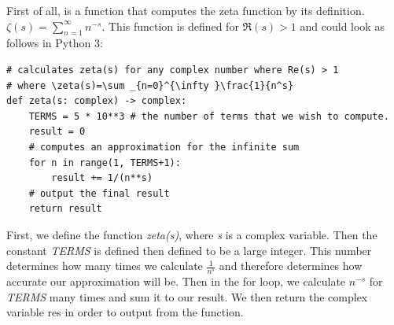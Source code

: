 \documentclass{article}
\begin{document}
First of all, is a function that computes the zeta function by its definition. $\zeta(s) = \sum_{n=1}^{\infty} n^{-s}$. This function is defined for $\Re(s) > 1$ and could look as follows in Python 3:

\begin{lstlisting}
# calculates zeta(s) for any complex number where Re(s) > 1
# where \zeta(s)=\sum _{n=0}^{\infty }\frac{1}{n^s}
def zeta(s: complex) -> complex:
    TERMS = 5 * 10**3 # the number of terms that we wish to compute.
    result = 0
    # computes an approximation for the infinite sum
    for n in range(1, TERMS+1):
        result += 1/(n**s)
    # output the final result
    return result
\end{lstlisting}

First, we define the function \textit{zeta(s)}, where \textit{s} is a complex variable. Then the constant \textit{TERMS} is defined then defined to be a large integer. This number determines how many times we calculate $\frac{1}{n^s}$ and therefore determines how accurate our approximation will be. Then in the for loop, we calculate $n^{-s}$ for \textit{TERMS} many times and sum it to our result. We then return the complex variable res in order to output from the function.
\end{document}
